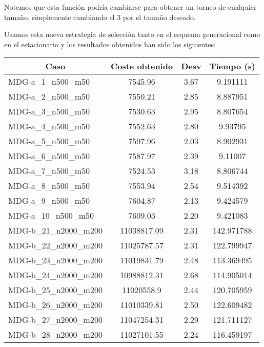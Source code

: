\documentclass[10pt,a4paper]{article}
\begin{document}
Notemos que esta función podría cambiarse para obtener un torneo de cualquier tamaño, simplemente cambiando el 3 por el tamaño deseado. 

Usamos esta nueva estrategia de selección tanto en el esquema generacional como en el estacionario y los resultados obtenidos han sido los siguientes:

\begin{table}[H]
	\begin{center}
		\begin{tabular}{|l|c|c|c|} 
			\hline
			\multicolumn{1}{|c|}{\textbf{Caso}} & \textbf{Coste obtenido} & \textbf{Desv} & \textbf{Tiempo (s)} \\ \hline
					\hline
					MDG-a\_1\_n500\_m50 & 7545.96 & 3.67 & 9.191111 \\ \hline
					MDG-a\_2\_n500\_m50 & 7550.21 & 2.85 & 8.887951 \\ \hline
					MDG-a\_3\_n500\_m50 & 7530.63 & 2.95 & 8.807654 \\ \hline
					MDG-a\_4\_n500\_m50 & 7552.63 & 2.80 & 9.93795 \\ \hline
					MDG-a\_5\_n500\_m50 & 7597.96 & 2.03 & 8.902931 \\ \hline
					MDG-a\_6\_n500\_m50 & 7587.97 & 2.39 & 9.11007 \\ \hline
					MDG-a\_7\_n500\_m50 & 7524.53 & 3.18 & 8.806744 \\ \hline
					MDG-a\_8\_n500\_m50 & 7553.94 & 2.54 & 9.514392 \\ \hline
					MDG-a\_9\_n500\_m50 & 7604.87 & 2.13 & 9.424579 \\ \hline
					MDG-a\_10\_n500\_m50 & 7609.03 & 2.20 & 9.421083 \\ \hline
					MDG-b\_21\_n2000\_m200 & 11038817.09 & 2.31 & 142.971788 \\ \hline
					MDG-b\_22\_n2000\_m200 & 11025787.57 & 2.31 & 122.799947 \\ \hline
					MDG-b\_23\_n2000\_m200 & 11019831.79 & 2.48 & 113.369495 \\ \hline
					MDG-b\_24\_n2000\_m200 & 10988812.31 & 2.68 & 114.905014 \\ \hline
					MDG-b\_25\_n2000\_m200 & 11020558.9 & 2.44 & 120.705959 \\ \hline
					MDG-b\_26\_n2000\_m200 & 11010339.81 & 2.50 & 122.609482 \\ \hline
					MDG-b\_27\_n2000\_m200 & 11047254.31 & 2.29 & 121.711127 \\ \hline
					MDG-b\_28\_n2000\_m200 & 11027101.55 & 2.24 & 116.459197 \\ \hline

\end{tabular}
\end{center}
\end{table}
\end{document}
